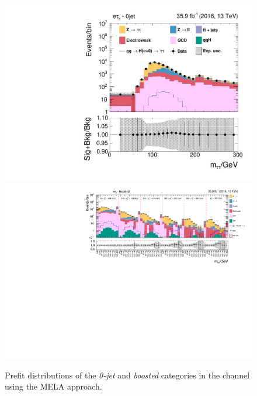 \begin{figure}[h!]
    \centering
        \includegraphics[width=.5\textwidth]{Figures/statana/Postfit_JEC_mela3D/prefit_htt_et_1_13TeV.pdf}\\
        \includegraphics[width=\textwidth]{Figures/statana/Postfit_JEC_mela3D/prefit_htt_et_2_13TeV.pdf}
    \caption{Prefit distributions of the \textit{0-jet} and \textit{boosted} categories in the \etau{} channel  using the MELA approach.}
\end{figure}  
